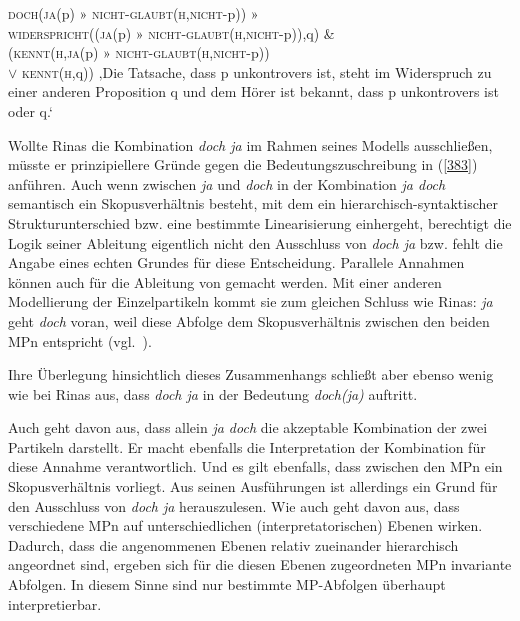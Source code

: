 \begin{exe}
	\ex\label{383} 
		\begin{xlist}	
			\ex\label{383a} \textsc{doch}(\textsc{ja}(p) » \textsc{nicht-glaubt}(\textsc{h},\textsc{nicht}-p))
				» \\ \textsc{widerspricht}((\textsc{ja}(p) » \textsc{nicht-glaubt}(\textsc{h},\textsc{nicht}-p)),q) \& \\
				(\textsc{kennt}(\textsc{h},\textsc{ja}(p) » \textsc{nicht-glaubt}(\textsc{h},\textsc{nicht}-p)) 
				\\ $\lor$ \textsc{kennt}(\textsc{h},q))
			\ex\label{383b} ‚Die Tatsache, dass p unkontrovers ist, steht im Widerspruch zu einer anderen Proposition q und 				dem Hörer ist bekannt, dass p unkontrovers ist oder q.‘ 
			\hfill\hbox{\citet[431]{Rinas2007}}
		\end{xlist}
\end{exe}
Wollte Rinas die Kombination \textit{doch ja} im Rahmen seines Modells ausschließen, müsste er prinzipiellere Gründe gegen die Bedeutungszuschreibung in (\ref{383}) anführen. Auch wenn zwischen \textit{ja} und \textit{doch} in der Kombination \textit{ja doch} semantisch ein Skopusverhältnis besteht, mit dem ein hierarchisch-syntaktischer Strukturunterschied bzw. eine bestimmte Linearisierung einhergeht, berechtigt die Logik seiner Ableitung eigentlich nicht den Ausschluss von \textit{doch ja} bzw. fehlt die Angabe eines echten Grundes für diese Entscheidung. Parallele Annahmen können auch für die Ableitung von \citet{Ormelius-Sandblom1997} gemacht werden. Mit einer anderen Modellierung der Einzelpartikeln kommt sie zum gleichen Schluss wie Rinas: \textit{ja} geht \textit{doch} voran, weil diese Abfolge dem Skopusverhältnis zwischen den beiden MPn entspricht (vgl.\ \citealt[92--93]{Ormelius-Sandblom1997}).

Ihre Überlegung hinsichtlich dieses Zusammenhangs schließt aber ebenso we\-nig wie bei Rinas aus, dass \textit{doch ja} in der Bedeutung \textit{doch(ja)} auftritt.

Auch \citet{Ickler1994} geht davon aus, dass allein \textit{ja doch} die akzeptable Kombination der zwei Partikeln darstellt. Er macht ebenfalls die Interpretation der Kombination für diese Annahme verantwortlich. Und es gilt ebenfalls, dass zwischen den MPn ein Skopusverhältnis vorliegt. Aus seinen Ausführungen ist allerdings ein Grund für den Ausschluss von \textit{doch ja} herauszulesen. Wie auch \citet{Vismans1994} geht \citet{Ickler1994} davon aus, dass verschiedene MPn auf unterschiedlichen (interpretatorischen) Ebenen wirken. Dadurch, dass die angenommenen Ebenen relativ zueinander hierarchisch angeordnet sind, ergeben sich für die diesen Ebenen zugeordneten MPn invariante Abfolgen. In diesem Sinne sind nur bestimmte MP-Abfolgen überhaupt interpretierbar.

